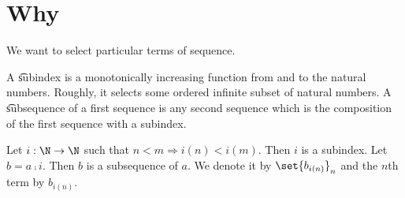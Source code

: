 
\section*{Why}

We want to select particular terms of sequence.

A \t{subindex} is a monotonically increasing function from and to the natural numbers.
Roughly, it selects some ordered infinite subset of natural numbers.
A \t{subsequence} of a first sequence is any second sequence which is the composition of the first sequence with a subindex.


Let $i: \N   \to \N  $ such that $n < m \Rightarrow i(n) < i(m)$.
Then $i$ is a subindex.
Let $b = a \comp i$.
Then $b$ is a subsequence of $a$.
We denote it by $\set{b_{i(n)}}_n$ and the $n$th term by $b_{i(n)}$.

\blankpage
